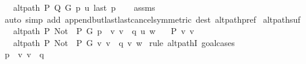 \begin{isabellebody}
\ \ \ {\isachardoublequoteopen}alt{\isacharunderscore}{\kern0pt}path\ P\ Q\ G\ p\ u\ {\isacharparenleft}{\kern0pt}last\ p{\isacharparenright}{\kern0pt}{\isachardoublequoteclose}\isanewline
%
\isadelimproof
\ \ %
\endisadelimproof
%
\isatagproof
{}\isamarkupfalse%
\ assms\isanewline
\ \ \isamarkupfalse%
\ {\isacharparenleft}{\kern0pt}auto\ simp\ add{\isacharcolon}{\kern0pt}\ append{\isacharunderscore}{\kern0pt}butlast{\isacharunderscore}{\kern0pt}last{\isacharunderscore}{\kern0pt}cancel{\isacharbrackleft}{\kern0pt}symmetric{\isacharbrackright}{\kern0pt}\ dest{\isacharcolon}{\kern0pt}\ alt{\isacharunderscore}{\kern0pt}path{\isacharunderscore}{\kern0pt}pref{\isacharparenright}{\kern0pt}%
\endisatagproof
{\isafoldproof}%
%
\isadelimproof
\isanewline
%
\endisadelimproof
\isanewline
{}\isamarkupfalse%
\ alt{\isacharunderscore}{\kern0pt}path{\isacharunderscore}{\kern0pt}suf{\isacharcolon}{\kern0pt}\isanewline
\ \ \ {\isachardoublequoteopen}alt{\isacharunderscore}{\kern0pt}path\ P\ {\isacharparenleft}{\kern0pt}Not\ {\isasymcirc}\ P{\isacharparenright}{\kern0pt}\ G\ {\isacharparenleft}{\kern0pt}p\ {\isacharat}{\kern0pt}\ {\isacharbrackleft}{\kern0pt}v{\isacharcomma}{\kern0pt}\ v{\isacharprime}{\kern0pt}{\isacharbrackright}{\kern0pt}\ {\isacharat}{\kern0pt}\ q{\isacharparenright}{\kern0pt}\ u\ w{\isachardoublequoteclose}\isanewline
\ \ \ {\isachardoublequoteopen}P\ {\isacharbraceleft}{\kern0pt}v{\isacharcomma}{\kern0pt}\ v{\isacharprime}{\kern0pt}{\isacharbraceright}{\kern0pt}{\isachardoublequoteclose}\isanewline
\ \ \ {\isachardoublequoteopen}alt{\isacharunderscore}{\kern0pt}path\ P\ {\isacharparenleft}{\kern0pt}Not\ {\isasymcirc}\ P{\isacharparenright}{\kern0pt}\ G\ {\isacharparenleft}{\kern0pt}{\isacharbrackleft}{\kern0pt}v{\isacharcomma}{\kern0pt}\ v{\isacharprime}{\kern0pt}{\isacharbrackright}{\kern0pt}\ {\isacharat}{\kern0pt}\ q{\isacharparenright}{\kern0pt}\ v\ w{\isachardoublequoteclose}\isanewline
%
\isadelimproof
%
\endisadelimproof
%
\isatagproof
{}\isamarkupfalse%
\ {\isacharparenleft}{\kern0pt}rule\ alt{\isacharunderscore}{\kern0pt}pathI{\isacharcomma}{\kern0pt}\ goal{\isacharunderscore}{\kern0pt}cases{\isacharparenright}{\kern0pt}\isanewline
\ \ \isamarkupfalse%
\ {}\isanewline
\ \ \isamarkupfalse%
\ {\isacharquery}{\kern0pt}p{\isacharprime}{\kern0pt}\ {\isacharequal}{\kern0pt}\ {\isachardoublequoteopen}{\isacharbrackleft}{\kern0pt}v{\isacharcomma}{\kern0pt}\ v{\isacharprime}{\kern0pt}{\isacharbrackright}{\kern0pt}\ {\isacharat}{\kern0pt}\ q{\isachardoublequoteclose}\isanewline

\end{isabellebody}

